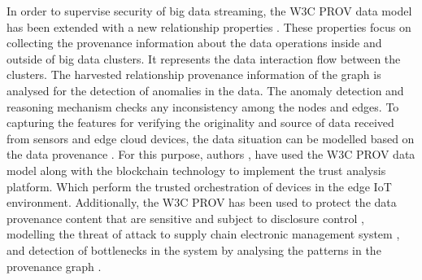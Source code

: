 
In order to supervise  security of big data streaming, the W3C PROV data model has been extended with a new relationship properties \cite{gao2020big}. These properties focus on  collecting the provenance information about the  data operations inside and outside of big data clusters. It represents the data interaction flow between the clusters. The harvested relationship provenance information of the graph is analysed for the detection of anomalies in the data. The anomaly detection and reasoning mechanism checks any inconsistency among the nodes and edges. To capturing the features for verifying the originality and source of data  received from sensors and edge cloud devices, the data situation can be modelled based on the data provenance . For this purpose, authors \cite{pahl2018architecture}, have used the W3C PROV data model along with the blockchain technology to implement the trust analysis platform. Which perform the trusted orchestration of devices in the edge  IoT environment. Additionally, the W3C PROV has been used to protect the data provenance content that are sensitive  and subject to disclosure control \cite{missier2020abstracting}, modelling the threat of attack to supply chain electronic management system \cite{halak2021cist}, and detection of bottlenecks in the system by analysing the patterns in the provenance graph \cite{boutamina2018bottleneck}.

